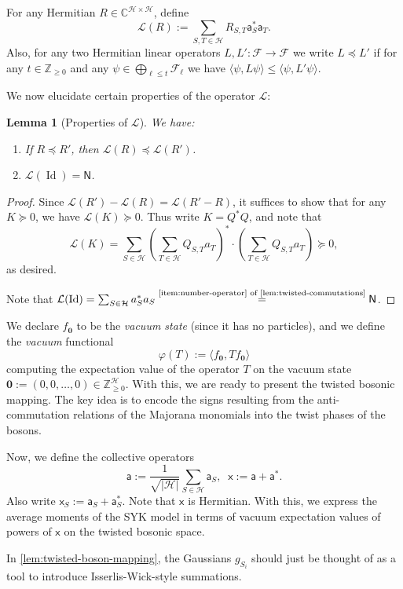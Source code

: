 \documentclass
[11pt,letterpaper]
{article}
\newtheorem{lemma}[theorem]{Lemma}
\theoremstyle{definition}
\newcommand{\sfa}{\mathsf a}
\newcommand{\sfx}{\mathsf x}
\newcommand{\Num}{\mathsf N}
\newcommand{\cF}{{\mathcal F}}
\newcommand{\1}{\mathbf{1}}
\newcommand{\Z}{\mathbb Z}
\newcommand{\C}{\mathbb C}
\newcommand{\cH}{\mathcal H}
\newcommand{\Id}{\operatorname{Id}}
\newcommand{\cL}{\mathcal L}
\renewcommand{\geq}{\geqslant}
\renewcommand{\leq}{\leqslant}
\renewcommand{\preceq}{\preccurlyeq}
\renewcommand{\succeq}{\succcurlyeq}
\begin{document}
For any Hermitian $R\in\C^{\cH\times\cH}$, define 
\[\cL(R):= \sum_{S, T\in\cH}R_{S, T}\sfa_S^*\sfa_T.\]
Also, for any two Hermitian linear operators $L, L':\cF\to\cF$ we write $L\preceq L'$ if for any $t\in\Z_{\geq 0}$ and any $\psi\in\bigoplus_{\ell\leq t}\cF_\ell$ we have $\langle\psi, L\psi\rangle\leq\langle\psi, L'\psi\rangle$.

We now elucidate certain properties of the operator $\cL$:
\begin{lemma}[Properties of $\cL$]\label{lem:cL-properties}
    We have:
    \begin{enumerate}[(1)]
        \item\label{item:order-preserving} If $R\preceq R'$, then $\cL(R)\preceq\cL(R')$.
        \item\label{item:identity-number} $\cL(\Id) = \Num$.
    \end{enumerate}
\end{lemma}
\begin{proof}
    Since $\cL(R') - \cL(R) = \cL(R' - R)$, it suffices to show that for any $K\succeq 0$, we have $\cL(K)\succeq 0$. Thus write $K = Q^*Q$, and note that 
    \[\cL(K) = \sum_{S\in\cH}\left(\sum_{T\in\cH}Q_{S, T}a_T\right)^*\cdot\left(\sum_{T\in\cH}Q_{S, T}a_T\right)\succeq 0,\]
    as desired.

    Note that $\cL(\Id) = \sum_{S\in\cH}a_S^*a_S \overset{\text{\cref{item:number-operator} of \cref{lem:twisted-commutations}}}{=} \Num$.
\end{proof}

We declare $f_{\bm 0}$ to be the \emph{vacuum state} (since it has no particles), and we define the \emph{vacuum} functional 
\[\varphi(T):= \langle f_{\bm{0}}, Tf_{\bm{0}}\rangle\]
computing the expectation value of the operator $T$ on the vacuum state $\bm{0}:= (0, 0, \ldots, 0)\in\Z_{\geq 0}^\cH$. With this, we are ready to present the twisted bosonic mapping. The key idea is to encode the signs resulting from the anti-commutation relations of the Majorana monomials into the twist phases of the bosons. 

Now, we define the collective operators
\[\sfa := \frac{1}{\sqrt{|\cH|}}\sum_{S\in\cH}\sfa _S, \;\; \sfx := \sfa  + \sfa ^*.\]
Also write $\sfx_S:= \sfa_S + \sfa_S^*$. Note that $\sfx$ is Hermitian. With this, we express the average moments of the SYK model in terms of vacuum expectation values of powers of $\sfx$ on the twisted bosonic space.

In \cref{lem:twisted-boson-mapping}, the Gaussians $g_{S_i}$ should just be thought of as a tool to introduce Isserlis-Wick-style summations.
\end{document}
